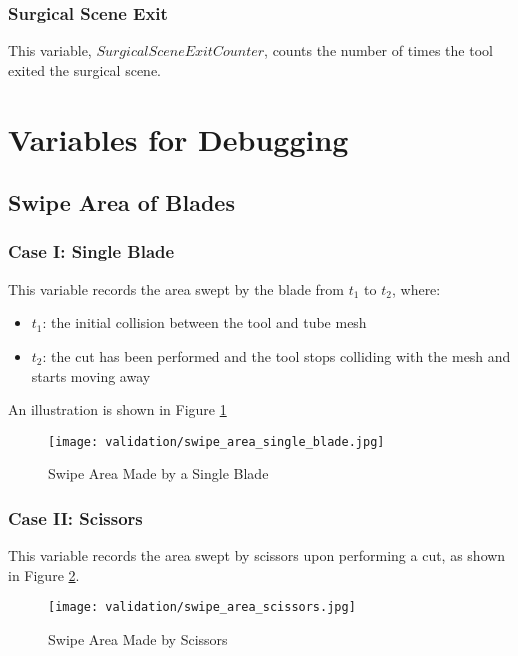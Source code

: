 \subsubsection{Surgical Scene Exit}\label{para:data_surgical_scene_exit}

This variable, $SurgicalSceneExitCounter$, counts the number of times the tool exited the surgical scene.

\section{Variables for Debugging}

\subsection{Swipe Area of Blades}\label{para:data_swipe_area_of_blades}

\subsubsection{Case I: Single Blade}

This variable records the area swept by the blade from $t_1$ to $t_2$, where:

\begin{itemize}
  \item $t_1$: the initial collision between the tool and tube mesh
  \item $t_2$: the cut has been performed and the tool stops colliding with the mesh and starts moving away
\end{itemize}

An illustration is shown in Figure \ref{fig:single_blade_area}

\begin{figure}
  \centering%
  \texttt{[image: validation/swipe\_area\_single\_blade.jpg]}
  \caption{Swipe Area Made by a Single Blade}\label{fig:single_blade_area}
\end{figure}

\subsubsection{Case II: Scissors}

This variable records the area swept by scissors upon performing a cut, as shown in Figure \ref{fig:scissors_area}.

\begin{figure}
  \centering%
  \texttt{[image: validation/swipe\_area\_scissors.jpg]}
  \caption{Swipe Area Made by Scissors}\label{fig:scissors_area}
\end{figure}


